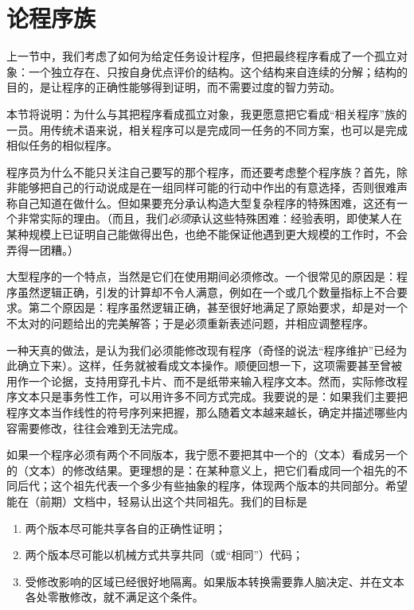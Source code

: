 \section[论程序族]{论程序族}

上一节中，我们考虑了如何为给定任务设计程序，但把最终程序看成了一个孤立对象：一个独立存在、只按自身优点评价的结构。这个结构来自连续的分解；结构的目的，是让程序的正确性能够得到证明，而不需要过度的智力劳动。

本节将说明：为什么与其把程序看成孤立对象，我更愿意把它看成“相关程序”族的一员。用传统术语来说，相关程序可以是完成同一任务的不同方案，也可以是完成相似任务的相似程序。

程序员为什么不能只关注自己要写的那个程序，而还要考虑整个程序族？首先，除非能够把自己的行动说成是在一组同样可能的行动中作出的有意选择，否则很难声称自己知道在做什么。但如果要充分承认构造大型复杂程序的特殊困难，这还有一个非常实际的理由。（而且，我们\textit{必须}承认这些特殊困难：经验表明，即使某人在某种规模上已证明自己能做得出色，也绝不能保证他遇到更大规模的工作时，不会弄得一团糟。）

大型程序的一个特点，当然是它们在使用期间必须修改。一个很常见的原因是：程序虽然逻辑正确，引发的计算却不令人满意，例如在一个或几个数量指标上不合要求。第二个原因是：程序虽然逻辑正确，甚至很好地满足了原始要求，却是对一个不太对的问题给出的完美解答；于是必须重新表述问题，并相应调整程序。

一种天真的做法，是认为我们必须能修改现有程序（奇怪的说法“程序维护”已经为此确立下来）。这样，任务就被看成文本操作。顺便回想一下，这项需要甚至曾被用作一个论据，支持用穿孔卡片、而不是纸带来输入程序文本。然而，实际修改程序文本只是事务性工作，可以用许多不同方式完成。我要说的是：如果我们主要把程序文本当作线性的符号序列来把握，那么随着文本越来越长，确定并描述哪些内容需要修改，往往会难到无法完成。

如果一个程序必须有两个不同版本，我宁愿不要把其中一个的（文本）看成另一个的（文本）的修改结果。更理想的是：在某种意义上，把它们看成同一个祖先的不同后代；这个祖先代表一个多少有些抽象的程序，体现两个版本的共同部分。希望能在（前期）文档中，轻易认出这个共同祖先。我们的目标是

\begin{enumerate}[wide, nosep, label=(\arabic*)]
	\item 两个版本尽可能共享各自的正确性证明；

	\item 两个版本尽可能以机械方式共享共同（或“相同”）代码；

	\item 受修改影响的区域已经很好地隔离。如果版本转换需要靠人脑决定、并在文本各处零散修改，就不满足这个条件。
\end{enumerate}

